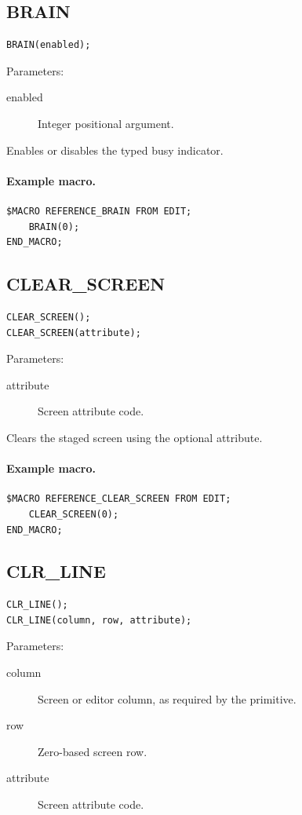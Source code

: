 \documentclass[a4paper,10pt,twoside,openany]{book}
\newenvironment{mrmacextension}{\begin{changebar}}{\end{changebar}}
\begin{document}
\begin{mrmacextension}
\label{prim:procedure-brain}
\subsection*{BRAIN}
\begin{verbatim}
BRAIN(enabled);
\end{verbatim}
Parameters:
\begin{description}
\item[enabled] Integer positional argument.
\end{description}

Enables or disables the typed busy indicator.

\paragraph{Example macro.}
\begin{verbatim}
$MACRO REFERENCE_BRAIN FROM EDIT;
    BRAIN(0);
END_MACRO;
\end{verbatim}
\end{mrmacextension}

\label{prim:procedure-clear-screen}
\subsection*{CLEAR\_SCREEN}
\begin{verbatim}
CLEAR_SCREEN();
CLEAR_SCREEN(attribute);
\end{verbatim}
Parameters:
\begin{description}
\item[attribute] Screen attribute code.
\end{description}

Clears the staged screen using the optional attribute.

\paragraph{Example macro.}
\begin{verbatim}
$MACRO REFERENCE_CLEAR_SCREEN FROM EDIT;
    CLEAR_SCREEN(0);
END_MACRO;
\end{verbatim}

\label{prim:procedure-clr-line}
\subsection*{CLR\_LINE}
\begin{verbatim}
CLR_LINE();
CLR_LINE(column, row, attribute);
\end{verbatim}
Parameters:
\begin{description}
\item[column] Screen or editor column, as required by the primitive.
\item[row] Zero-based screen row.
\item[attribute] Screen attribute code.
\end{description}
\end{document}
